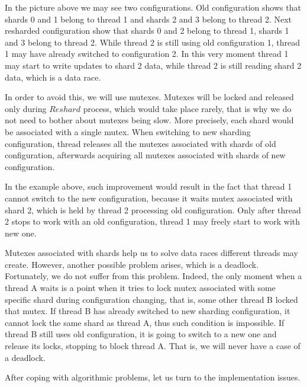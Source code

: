 \documentclass{article}
\begin{document}
In the picture above we may see two configurations. Old configuration shows that shards 0 and 1 belong to thread 1 and shards 2 and 3 belong to thread 2. Next resharded configuration show that shards 0 and 2 belong to thread 1, shards 1 and 3 belong to thread 2. While thread 2 is still using old configuration 1, thread 1 may have already switched to configuration 2. In this very moment thread 1 may start to write updates to shard 2 data, while thread 2 is still reading shard 2 data, which is a data race.

In order to avoid this, we will use mutexes. Mutexes will be locked and released only during $Reshard$ process, which would take place rarely, that is why we do not need to bother about mutexes being slow. More precisely, each shard would be associated with a single mutex. When switching to new sharding configuration, thread releases all the mutexes associated with shards of old configuration, afterwards acquiring all mutexes associated with shards of new configuration.

In the example above, such improvement would result in the fact that thread 1 cannot switch to the new configuration, because it waits mutex associated with shard 2, which is held by thread 2 processing old configuration. Only after thread 2 stops to work with an old configuration, thread 1 may freely start to work with new one.

Mutexes associated with shards help us to solve data races different threads may create. However, another possible problem arises, which is a deadlock. Fortunately, we do not suffer from this problem. Indeed, the only moment when a thread A waits is a point when it tries to lock mutex associated with some specific shard during configuration changing, that is, some other thread B locked that mutex. If thread B has already switched to new sharding configuration, it cannot lock the same shard as thread A, thus such condition is impossible. If thread B still uses old configuration, it is going to switch to a new one and release its locks, stopping to block thread A. That is, we will never have a case of a deadlock.

After coping with algorithmic problems, let us turn to the implementation issues.
\end{document}
